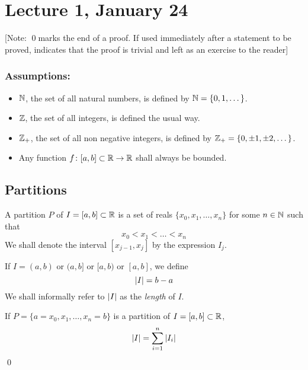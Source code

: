 \chapter*{Lecture 1, January 24}
\setcounter{chapter}{1}

[Note: \qed \quad marks the end of a proof. If used immediately after a statement to be proved, indicates that the proof is trivial and left as an exercise to the reader]

\subsection*{Assumptions:}

\begin{itemize}
\item
  $\mathbb{N}$, the set of all natural numbers, is defined by $\mathbb{N} = \{0, 1, \dots \}$.

\item
  $\mathbb{Z}$, the set of all integers, is defined the usual way.
  
\item
  $\mathbb{Z}_+$, the set of all non negative integers, is defined by $\mathbb{Z}_+ = \{0, \pm 1, \pm 2, \dots \}$.

\item
  Any function $f \colon [a, b] \subset \mathbb{R} \to \mathbb{R}$ shall always be bounded.

\end{itemize}

\section{Partitions}

\begin{defn}
  A partition $P$ of $I = [a, b] \subset \mathbb{R}$ is a set of reals $\{x_0, x_1, \dots ,x_n \}$ for some $n \in \mathbb{N}$ such that
  \[
    x_0 < x_1 < \dots < x_n
  \]
  We shall denote the interval $[x_{j-1}, x_j]$ by the expression $I_j$.
\end{defn}

\begin{defn}
  If $I = (a, b)$ or $(a, b]$ or $[a, b)$ or $[a, b]$, we define
  \[
    \abs{I} = b - a
  \]
  We shall informally refer to $\abs{I}$ as the \textit{length} of $I$.
\end{defn}

\begin{claim}
  If $P = \{a = x_0, x_1, \dots ,x_n = b \}$ is a partition of $I = [a, b] \subset \mathbb{R}$,
  \[
    \abs{I} = \sum_{i=1}^n \abs{I_i}
  \]
  \hfill\qed
\end{claim}

